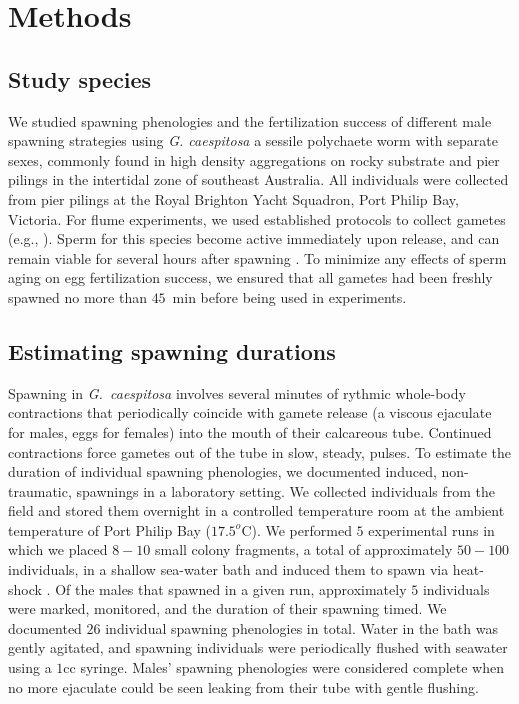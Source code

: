 \documentclass{article}
\begin{document}
\section{Methods} 
	\label{sec:methods}

	\subsection*{Study species}
	We studied spawning phenologies and the fertilization success of different male spawning strategies using \textit{G. caespitosa} a sessile polychaete worm with separate sexes, commonly found in high density aggregations on rocky substrate and pier pilings in the intertidal zone of southeast Australia. All individuals were collected from pier pilings at the Royal Brighton Yacht Squadron, Port Philip Bay, Victoria. For flume experiments, we used established protocols to collect gametes (e.g., \citealt{MarshallEvans2005a, MarshallEvans2005b}). Sperm for this species become active immediately upon release, and can remain viable for several hours after spawning \citep{Kupriyanova2013}. To minimize any effects of sperm aging on egg fertilization success, we ensured that all gametes had been freshly spawned no more than $45$~min before being used in experiments.

	\subsection*{Estimating spawning durations}
	Spawning in \textit{G.~caespitosa} involves several minutes of rythmic whole-body contractions that periodically coincide with gamete release (a viscous ejaculate for males, eggs for females) into the mouth of their calcareous tube. Continued contractions force gametes out of the tube in slow, steady, pulses. To estimate the duration of individual spawning phenologies, we documented induced, non-traumatic, spawnings in a laboratory setting. We collected individuals from the field and stored them overnight in a controlled temperature room at the ambient temperature of Port Philip Bay ($17.5^o$C). We performed $5$ experimental runs in which we placed $8-10$ small colony fragments, a total of approximately $50-100$ individuals, in a shallow sea-water bath and induced them to spawn via heat-shock \citep{Strathmann1987}. Of the males that spawned in a given run, approximately $5$ individuals were marked, monitored, and the duration of their spawning timed. We documented $26$ individual spawning phenologies in total. Water in the bath was gently agitated, and spawning individuals were periodically flushed with seawater using a $1$cc syringe. Males' spawning phenologies were considered complete when no more ejaculate could be seen leaking from their tube with gentle flushing. 
\end{document}

